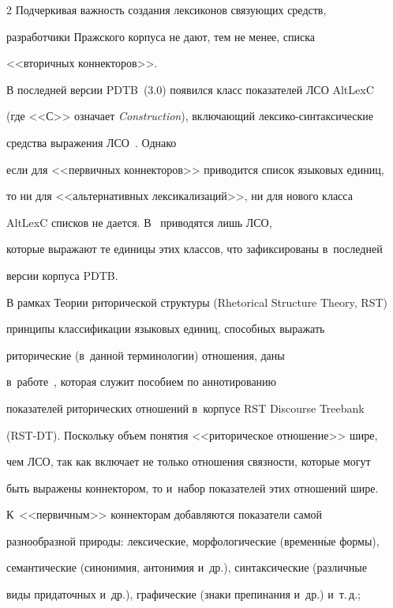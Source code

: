 \begin{multicols}{2}
Подчеркивая важность создания лексиконов связующих средств, 


разработчики Пражского корпуса не дают, тем не менее, списка 


<<вторичных коннекторов>>.





В последней версии PDTB~(3.0) появился класс показателей ЛСО AltLexC 


(где <<С>> означает \textit{Construction}), включающий лексико-син\-так\-си\-че\-ские 


средства выражения ЛСО~\cite[с.~9--10, 76]{14-in}. Однако 


если для <<первичных коннекторов>> приводится список языковых единиц, 


то ни для <<альтернативных лексикализаций>>, ни для нового класса 


AltLexC списков не дается. В~\cite[с.~75--76]{14-in} приводятся лишь ЛСО, 


которые выражают те единицы этих классов, что зафиксированы в~последней 


версии корпуса PDTB.





В рамках Теории риторической структуры (Rhetorical Structure Theory, RST) 


принципы классификации языковых единиц, способных выражать 


риторические (в~данной терминологии) отношения, даны  


в~работе~\cite[с.~8, 9]{15-in}, которая служит пособием по аннотированию 


показателей риторических отношений в~корпусе RST Discourse Treebank 


(RST-DT). Поскольку объем понятия <<риторическое отношение>> шире, 


чем ЛСО, так как включает не только отношения связности, которые могут 


быть выражены коннектором, то и~набор показателей этих отношений шире. 


К~<<первичным>> коннекторам добавляются показатели самой 


разнообразной природы: лексические, морфологические (временн$\acute{\mbox{ы}}$е формы), 


семантические (синонимия, антонимия и~др.), синтаксические (различные 


виды придаточных и~др.), графические (знаки препинания и~др.) и~т.\,д.; 



\end{multicols}
